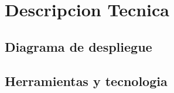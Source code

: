 \section{Descripcion Tecnica}
\subsection{Diagrama de despliegue}
\subsection{Herramientas y tecnologia}